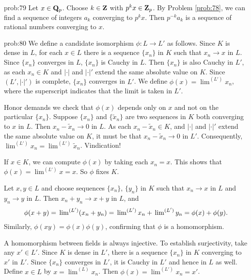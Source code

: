 \begin{sol}{prob:79} Let $x \in \mathbf{Q}_p$. Choose $k \in \mathbf{Z}$ with $p^k x \in \mathbf{Z}_p$. By Problem \ref{prob:78}, we can find a sequence of integers $a_k$ converging to $p^k x$. Then $p^{-k} a_k$ is a sequence of rational numbers converging to $x$.
\end{sol}


\begin{sol}{prob:80} We define a candidate isomorphism $\phi\colon L\to L'$ as follows. Since $K$ is dense in $L$, for each $x \in L$ there is a sequence $\{x_n\}$ in $K$ such that $x_n\to x$ in $L$. Since $\{x_n\}$ converges in $L$, $\{x_n\}$ is Cauchy in $L$. Then $\{x_n\}$ is also Cauchy in $L'$, as each $x_n \in K$ and $|\cdot|$ and $|\cdot|'$ extend the same absolute value on $K$. Since $(L',|\cdot|')$ is complete, $\{x_n\}$ converges in $L'$. We define $\phi(x) = \lim^{(L')} x_n$, where the superscript indicates that the limit is taken in $L'$.

Honor demands we check that $\phi(x)$ depends only on $x$ and not on the particular $\{x_n\}$. Suppose $\{x_n\}$  and $\{\tilde{x}_n\}$ are two sequences in $K$ both converging to $x$ in $L$. Then $x_n-\tilde{x}_n \to 0$ in $L$. As each $x_n -\tilde{x}_n \in K$, and $|\cdot|$ and $|\cdot|'$ extend the same absolute value on $K$, it must be that $x_n-\tilde{x}_n \to 0$ in $L'$. Consequently, $\lim^{(L')} x_n = \lim^{(L')} \tilde{x}_n$. Vindication! 

If $x \in K$, we can compute $\phi(x)$ by taking each $x_n=x$. This shows that $\phi(x) = \lim^{(L')} x = x$. So $\phi$ fixes $K$.

Let $x, y \in L$ and choose sequences $\{x_n\}$, $\{y_n\}$ in $K$ such that $x_n\to x$ in $L$ and $y_n\to y$ in $L$. Then $x_n+y_n \to x+y$ in $L$, and
\[ \phi(x+y) = \sideset{}{^{(L')}}\lim (x_n+y_n) = \sideset{}{^{(L')}}\lim x_n + \sideset{}{^{(L')}}\lim y_n = \phi(x) + \phi(y). \]
Similarly, $\phi(xy) = \phi(x) \phi(y)$, confirming that $\phi$ is a homomorphism.

A homomorphism between fields is always injective. To establish surjectivity, take any $x' \in L'$. Since $K$ is dense in $L'$, there is a sequence $\{x_n\}$ in $K$ converging to $x'$ in $L'$. Since $\{x_n\}$ converges in $L'$, it is Cauchy in $L'$ and hence in $L$ as well. Define $x \in L$ by $x = \lim^{(L)} x_n$. Then $\phi(x) = \lim^{(L')} x_n = x'$. 


\end{sol}
